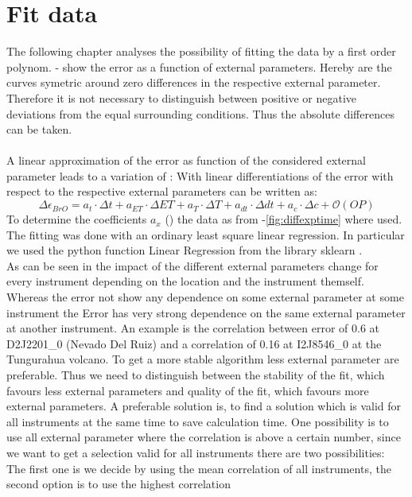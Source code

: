 \documentclass  [
  paper    = a4,
  BCOR     = 10mm,
  twoside,
  fontsize = 12pt,
  fleqn,
  toc      = bibnumbered,
  toc      = listofnumbered,
  numbers  = noendperiod,
  headings = normal,
  listof   = leveldown,
  version  = 3.03
]                                       {scrreprt}
\begin{document}
	
	\section{Fit data}
	The following chapter analyses the possibility of fitting the data by a first order polynom. - show the   error as a function of external parameters. Hereby are the curves symetric around zero differences in the respective external parameter. Therefore it is not necessary to distinguish between positive or negative deviations from the equal surrounding conditions. Thus the absolute differences can be taken.\\
	\\
	A linear approximation of the   error as function of the considered external parameter leads to a variation of   :
	With linear differentiations of the   error with respect to the respective external parameters  can be written as:	
	\begin{equation}
		\Delta \epsilon_{BrO} = a_{t}\cdot\Delta t+a_{ET}\cdot\Delta ET+a_{T}\cdot\Delta T+a_{dt}\cdot\Delta dt +a_{c}\cdot\Delta c + \mathcal{O}\left(OP\right)
		\label{calc:delterr}
	\end{equation}
	To determine the coefficients $a_{x}$ () the data as from -\ref{fig:diffexptime} where used.  The fitting was done with an ordinary least square linear regression. In particular we used the python function Linear Regression from the library sklearn \citep{SKlearn}. \\
	
	As can be seen in  the impact of the different external parameters change for every instrument depending on the location and the instrument themself. 
	Whereas the   error not show any dependence on some external parameter at some instrument the Error has very strong dependence on the same external parameter at another instrument. An example is the correlation between   error of 0.6 at D2J2201\_0 (Nevado Del Ruiz) and a correlation of 0.16 at I2J8546\_0 at the Tungurahua volcano.
	To get a more stable algorithm less external parameter are preferable. Thus we need to distinguish between the stability of the fit, which favours less external parameters and quality of the fit, which favours more external parameters. 
	A preferable solution is, to find a solution which is valid for all instruments at the same time to save calculation time. 
	One possibility is to use all external parameter where the correlation is above a certain number, since we want to get a selection valid for all instruments there are two possibilities: The first one is we decide by using the mean correlation of all instruments, the second option is to use the highest correlation
	
\end{document}
